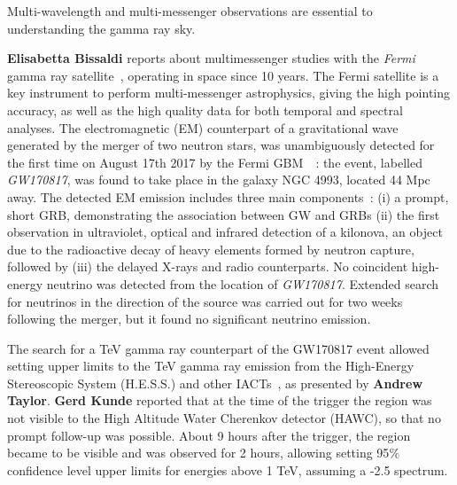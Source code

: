 \documentclass{PoS}
\begin{document}

Multi-wavelength and multi-messenger observations are 
essential to understanding the gamma ray sky.


{\bf Elisabetta Bissaldi} reports about multimessenger studies with the \textit{Fermi} gamma ray satellite~\cite{Bissaldi}, operating in space since 10 years. 
The Fermi satellite is a key instrument to perform multi-messenger astrophysics, giving the high pointing accuracy, as well as the high quality data for both temporal and spectral analyses. The  electromagnetic (EM) counterpart of a gravitational wave generated by the merger of two neutron stars, was unambiguously detected for the first time on August 17th 2017 by the Fermi GBM~\cite{Gold2017}~\cite{Abbott2017}: the event, labelled \textit{GW170817}, was found to take place in the galaxy NGC 4993, located 44 Mpc away. The detected EM emission includes three main components~\cite{TheMMpaper}: (i) a prompt, short GRB, demonstrating the association between GW and GRBs (ii) the first observation in ultraviolet, optical and infrared detection of a  kilonova, an object  due to the radioactive decay of heavy elements formed by neutron capture, followed by (iii) the delayed X-rays and radio counterparts. 
No coincident high-energy neutrino was detected  from the location of \textit{GW170817}. Extended search for neutrinos in the direction of the source was carried out for two weeks following the merger, but it found no significant neutrino emission. 

The search for a TeV gamma ray counterpart of the GW170817 event allowed setting upper limits to the TeV gamma ray emission from the High-Energy Stereoscopic System (H.E.S.S.)
and other IACTs~\cite{TheMMpaper}, as presented by {\bf Andrew Taylor}. 
{\bf Gerd Kunde} reported that at the time of the trigger the region was not visible to the High Altitude Water Cherenkov detector (HAWC), so that no prompt follow-up was possible. About 9 hours after the trigger, the region became to be visible and was observed for 2 hours, allowing setting 95$\%$ confidence level upper limits for energies above 1 TeV, assuming a -2.5 spectrum. 
\end{document}
